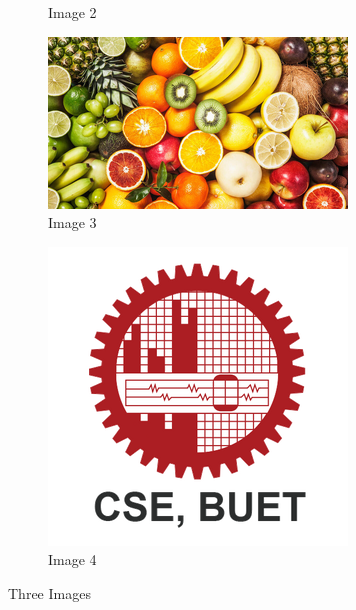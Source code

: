 \documentclass{article}
\begin{document}
\begin{figure}[htbp]
\begin{subfigure}{0.4\textwidth}
         \caption{Image 2}
         \label{fig:2}
     \end{subfigure}
     \hfill
     \begin{subfigure}{0.6\textwidth}
         \centering
         \includegraphics[width=\textwidth]{Images/Fruits.png}
         \caption{Image 3}
         \label{fig:3}
     \end{subfigure}
     \hfill
     \begin{subfigure}{0.3\textwidth}
         \centering
         \includegraphics[width=\textwidth]{Images/CSE_BUET.png}
         \caption{Image 4}
         \label{fig:4}
     \end{subfigure}
     
        \caption{Three Images}
        \label{fig:4 graphs}
\end{figure}
\end{document}
